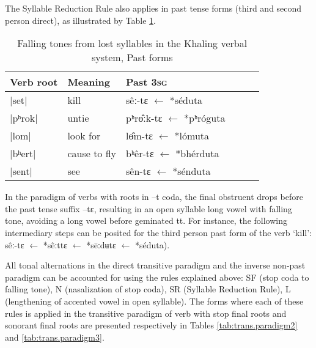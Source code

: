 \documentclass[oldfontcommands,oneside,a4paper,11pt]{article}
\newcommand{\ipa}[1]{{\phon \mbox{#1}}} %
\begin{document}
The Syllable Reduction Rule also applies in past tense forms (third and second person direct), as illustrated by Table \ref{tab:falling.verb3}. 

 
\begin{table}[H] 
\caption{Falling tones from lost syllables in the Khaling verbal system, Past forms} \centering  \label{tab:falling.verb3} 
\begin{tabular}{llllll} 
\toprule 
Verb root	&Meaning	& Past \textsc{3sg} \\ 
\midrule 
|set|	&	kill			&\ipa{sêː-tɛ} $\leftarrow$ \ipa{*séduta}  \\ 
|pʰrok|	&	untie		&\ipa{pʰrɵ̂ːk-tɛ} $\leftarrow$ \ipa{*pʰróguta} \\
|lom|	&	look for		&\ipa{lɵ̂m-tɛ} $\leftarrow$ \ipa{*lómuta}  \\ 
\midrule
|bʰert|	&	cause to fly			&\ipa{bʰêr-tɛ} $\leftarrow$ \ipa{*bhérduta} \\ 
|sent|	&	see			&\ipa{sên-tɛ} $\leftarrow$ \ipa{*sénduta}  \\ 
\bottomrule 
\end{tabular} 
\end{table} 

In the paradigm of verbs with roots in \ipa{--t} coda, the final obstruent drops before the past tense suffix \ipa{--tɛ}, resulting in an open syllable long vowel with falling tone, avoiding a long vowel before geminated \ipa{tt}. For instance, the following intermediary steps can be posited for the third person past form of the verb `kill': \ipa{sêː-tɛ}   $\leftarrow$ \ipa{*sêːttɛ}  $\leftarrow$ \ipa{*sēːdʉtɛ}  $\leftarrow$ \ipa{*séduta}).



All tonal alternations in the direct transitive paradigm and the inverse non-past paradigm can be accounted for using the rules explained above: SF (stop coda to falling tone), N (nasalization of stop coda), SR (Syllable Reduction Rule), L (lengthening of accented vowel in open syllable). The forms where each of these rules is applied in the transitive paradigm of verb with stop final roots and sonorant final roots are presented respectively in Tables \ref{tab:trans.paradigm2} and \ref{tab:trans.paradigm3}.
\end{document}

